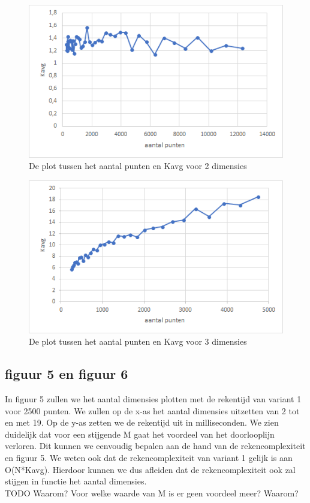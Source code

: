 \documentclass[12pt]{article}
\begin{document}
\begin{figure}
\includegraphics[width=\textwidth]{punten-Kavg}
\caption{De plot tussen het aantal punten en Kavg voor 2 dimensies}
\end{figure}

\begin{figure}
\includegraphics[width=\textwidth]{punten-Kavgdim3.png}
\caption{De plot tussen het aantal punten en Kavg voor 3 dimensies}
\end{figure}



\subsection{figuur 5 en figuur 6}

In figuur 5 zullen we het aantal dimensies plotten met de rekentijd van variant 1 voor 2500 punten.
We zullen op de x-as het aantal dimensies uitzetten van 2 tot en met 19.
Op de y-as zetten we de rekentijd uit in milliseconden.
We zien duidelijk dat voor een stijgende M gaat het voordeel van het doorlooplijn verloren.
Dit kunnen we eenvoudig bepalen aan de hand van de rekencomplexiteit en figuur 5.
We weten ook dat de rekencomplexiteit van variant 1 gelijk is aan O(N*Kavg).
Hierdoor kunnen we dus afleiden dat de rekencomplexiteit ook zal stijgen in functie het aantal dimensies.
\\TODO Waarom? Voor welke waarde van M is er geen voordeel meer? Waarom?
\end{document}
